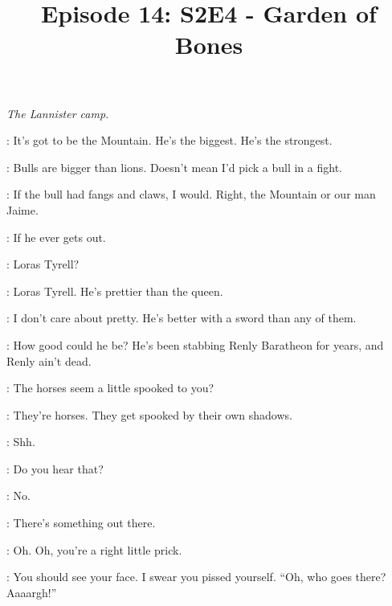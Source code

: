 

\title{Episode 14: S2E4 - Garden of Bones}
\author{}
\date{}
\maketitle




\scene

\textit{The Lannister camp.} 


\LANNISTERGUARD: It's got to be the Mountain. He's the biggest. He's the strongest. 

\RENNICK: Bulls are bigger than lions. Doesn't mean I'd pick a bull in a fight. 

\LANNISTERGUARD: If the bull had fangs and claws, I would. Right, the Mountain or our man Jaime. 

\RENNICK: If he ever gets out. 

\LANNISTERGUARD: Loras Tyrell? 

\RENNICK: Loras Tyrell. He's prettier than the queen. 

\LANNISTERGUARD: I don't care about pretty. He's better with a sword than any of them. 

\RENNICK: How good could he be? He's been stabbing Renly Baratheon for years, and Renly ain't dead. 


\RENNICK: The horses seem a little spooked to you? 

\LANNISTERGUARD: They're horses. They get spooked by their own shadows. 

\RENNICK: Shh. 


\RENNICK: Do you hear that? 

\LANNISTERGUARD: No. 

\RENNICK: There's something out there. 



\LANNISTERGUARD: Oh. Oh, you're a right little prick. 

\RENNICK: You should see your face. I swear you pissed yourself. ``Oh, who goes there? Aaaargh!'' 

